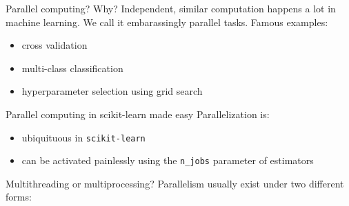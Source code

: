 \documentclass[13pt, usenames,dvipsnames]{beamer} %
\newcommand{\mycode}[2][\tiny] {\texttt{#2}}
\begin{document}
    \begin{frame}[t]{Parallel computing? Why?}
        \small
        \vspace{1cm}
        Independent, similar computation happens a lot in machine learning. We
        call it embarassingly parallel tasks. Famous examples:
        \vspace{1cm}
        \begin{itemize}
            \item<2-> cross validation
            \item<3-> multi-class classification
            \item<4-> hyperparameter selection using grid search
        \end{itemize}
        \vspace{1cm}
    \end{frame}

    \begin{frame}[fragile]{Parallel computing in scikit-learn made easy}
        \small
        Parallelization is:
        \begin{itemize}
            \item<2-> ubiquituous in \mycode{scikit-learn}
            \item<3-> can be activated painlessly using the \mycode{n_jobs} parameter of estimators
        \end{itemize}
    \end{frame}

    \begin{frame}[fragile]{Multithreading or multiprocessing?}
        Parallelism usually exist under two different forms:
    \end{frame}
\end{document}
